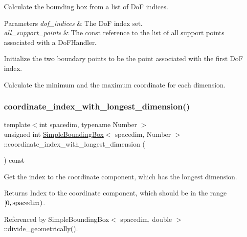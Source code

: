 Calculate the bounding box from a list of DoF indices. 
\begin{DoxyParams}{Parameters}
{\em dof\+\_\+indices} & The DoF index set. \\
\hline
{\em all\+\_\+support\+\_\+points} & The const reference to the list of all support points associated with a Do\+F\+Handler. \\
\hline
\end{DoxyParams}
Initialize the two boundary points to be the point associated with the first DoF index.

Calculate the minimum and the maximum coordinate for each dimension.\mbox{\label{classSimpleBoundingBox_abc665d7750573194c9c449ef67c40113}} 
\subsubsection{\texorpdfstring{coordinate\+\_\+index\+\_\+with\+\_\+longest\+\_\+dimension()}{coordinate\_index\_with\_longest\_dimension()}}
{\footnotesize\ttfamily template$<$int spacedim, typename Number $>$ \\
unsigned int \hyperlink{classSimpleBoundingBox}{Simple\+Bounding\+Box}$<$ spacedim, Number $>$\+::coordinate\+\_\+index\+\_\+with\+\_\+longest\+\_\+dimension (\begin{DoxyParamCaption}{ }\end{DoxyParamCaption}) const}

Get the index to the coordinate component, which has the longest dimension. \begin{DoxyReturn}{Returns}
Index to the coordinate component, which should be in the range $[0, {\rm spacedim})$. 
\end{DoxyReturn}


Referenced by Simple\+Bounding\+Box$<$ spacedim, double $>$\+::divide\+\_\+geometrically().

\mbox{\label{classSimpleBoundingBox_a0b8bef0a9504e22a7e2c4cc3d4ed04c4}} 
